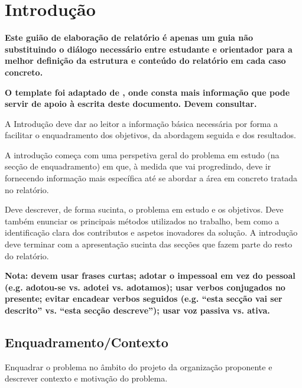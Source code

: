 \chapter{Introdução} %
\label{cap:introdução} %

\textbf{Este guião de elaboração de relatório é apenas um guia não substituindo o diálogo necessário entre estudante e orientador para a melhor definição da estrutura e conteúdo do relatório em cada caso concreto.}

\textbf{O template foi adaptado de \cite{TMDEIThesisTemplate}, onde consta mais informação que pode servir de apoio à escrita deste documento. Devem consultar.}


A Introdução deve dar ao leitor a informação básica necessária por forma a facilitar o enquadramento dos objetivos, da abordagem seguida e dos resultados. 

A introdução começa com uma perspetiva geral do problema em estudo (na secção de enquadramento) em que, à medida que vai progredindo, deve ir fornecendo informação mais específica até se abordar a área em concreto tratada no relatório. 

Deve descrever, de forma sucinta, o problema em estudo e os objetivos. Deve também enunciar os principais métodos utilizados no trabalho, bem como a identificação clara dos contributos e aspetos inovadores da solução. A introdução deve terminar com a apresentação sucinta das secções que fazem parte do resto do relatório. 


\textbf{Nota: devem usar frases curtas; adotar o impessoal em vez do pessoal (e.g. adotou-se vs. adotei vs. adotamos); usar verbos conjugados no presente; evitar encadear verbos seguidos (e.g. “esta secção vai ser descrito” vs. “esta secção descreve”); usar voz passiva vs. ativa.}



\section{Enquadramento/Contexto} 
\label{sec:enquadramento} %

Enquadrar o problema no âmbito do projeto da organização proponente e descrever contexto e motivação do problema. 



